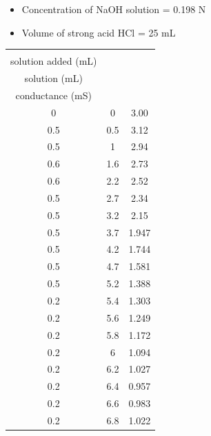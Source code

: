 \documentclass[11pt, a4paper, abstract=true]{scrartcl}
\begin{document}
\begin{itemize}
    \item Concentration of NaOH solution = 0.198 N
    \item Volume of strong acid HCl = 25 mL
\end{itemize}
\begin{longtable}[c]{|c|c|c|}
    \hline
    \begin{tabular}[c]{@{}c@{}}Vol. of NaOH\\ solution added (mL)\end{tabular} &
      \begin{tabular}[c]{@{}c@{}}Total vol. of NaOH \\ solution (mL)\end{tabular} &
      \begin{tabular}[c]{@{}c@{}}Observed \\ conductance (mS)\end{tabular} \\ \hline
    \endfirsthead
    \endhead
    0   & 0    & 3.00  \\ \hline
    0.5 & 0.5  & 3.12  \\ \hline
    0.5 & 1    & 2.94  \\ \hline
    0.6 & 1.6  & 2.73  \\ \hline
    0.6 & 2.2  & 2.52  \\ \hline
    0.5 & 2.7  & 2.34  \\ \hline
    0.5 & 3.2  & 2.15  \\ \hline
    0.5 & 3.7  & 1.947 \\ \hline
    0.5 & 4.2  & 1.744 \\ \hline
    0.5 & 4.7  & 1.581 \\ \hline
    0.5 & 5.2  & 1.388 \\ \hline
    0.2 & 5.4  & 1.303 \\ \hline
    0.2 & 5.6  & 1.249 \\ \hline
    0.2 & 5.8  & 1.172 \\ \hline
    0.2 & 6    & 1.094 \\ \hline
    0.2 & 6.2  & 1.027 \\ \hline
    0.2 & 6.4  & 0.957 \\ \hline
    0.2 & 6.6  & 0.983 \\ \hline
    0.2 & 6.8  & 1.022 \\ \hline

\end{longtable}
\end{document}
